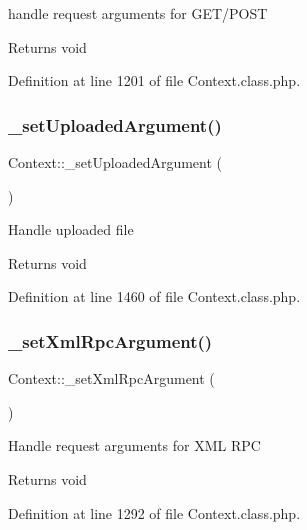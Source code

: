 handle request arguments for G\+E\+T/\+P\+O\+ST

\begin{DoxyReturn}{Returns}
void 
\end{DoxyReturn}


Definition at line 1201 of file Context.\+class.\+php.

\hypertarget{classContext_a9c821f96670ef47c7139bafc6b39091b}{}\label{classContext_a9c821f96670ef47c7139bafc6b39091b} 
\subsubsection{\texorpdfstring{\+\_\+set\+Uploaded\+Argument()}{\_setUploadedArgument()}}
{\footnotesize\ttfamily Context\+::\+\_\+set\+Uploaded\+Argument (\begin{DoxyParamCaption}{ }\end{DoxyParamCaption})}

Handle uploaded file

\begin{DoxyReturn}{Returns}
void 
\end{DoxyReturn}


Definition at line 1460 of file Context.\+class.\+php.

\hypertarget{classContext_abaa9eeef192a9e4b48a06d0af9b1fd05}{}\label{classContext_abaa9eeef192a9e4b48a06d0af9b1fd05} 
\subsubsection{\texorpdfstring{\+\_\+set\+Xml\+Rpc\+Argument()}{\_setXmlRpcArgument()}}
{\footnotesize\ttfamily Context\+::\+\_\+set\+Xml\+Rpc\+Argument (\begin{DoxyParamCaption}{ }\end{DoxyParamCaption})}

Handle request arguments for X\+ML R\+PC

\begin{DoxyReturn}{Returns}
void 
\end{DoxyReturn}


Definition at line 1292 of file Context.\+class.\+php.

